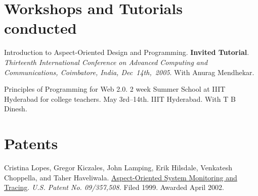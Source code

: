 \documentclass[11pt,margin,line]{res}
\begin{document}
\begin{resume}








\section{Workshops and Tutorials conducted}

Introduction to Aspect-Oriented Design and Programming.
{\bf Invited Tutorial}.  {\em Thirteenth International
  Conference on Advanced Computing and Communications,
  Coimbatore, India, Dec~14th,~2005}.  With Anurag
Mendhekar.

Principles of Programming for Web 2.0.  2 week Summer School
at IIIT Hyderabad for college teachers.  May 3rd--14th.
IIIT Hyderabad.  With T B Dinesh.


\vspace{2em}

\section{\sc Patents}

Cristina Lopes, Gregor Kiczales, John Lamping, Erik Hilsdale,
Venkatesh Choppella, and Taher Haveliwala.
\href{http://www.patentstorm.us/patents/6473895.html}
{Aspect-Oriented System Monitoring and Tracing}.  {\em {U.S.
    Patent No. 09/357,508.}} Filed 1999. Awarded April 2002.


\end{resume}
\end{document}
